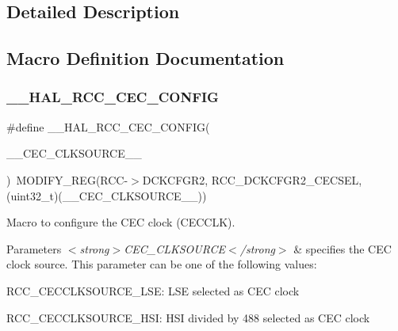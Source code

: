 \subsection{Detailed Description}


\subsection{Macro Definition Documentation}
\mbox{\label{group___r_c_c_ex___exported___macros_ga9e0aa37c13e7e0751abf5c271ff0affb}} 
\subsubsection{\texorpdfstring{\_\_HAL\_RCC\_CEC\_CONFIG}{\_\_HAL\_RCC\_CEC\_CONFIG}}
{\footnotesize\ttfamily \#define \+\_\+\+\_\+\+H\+A\+L\+\_\+\+R\+C\+C\+\_\+\+C\+E\+C\+\_\+\+C\+O\+N\+F\+IG(\begin{DoxyParamCaption}\item[{}]{\+\_\+\+\_\+\+C\+E\+C\+\_\+\+C\+L\+K\+S\+O\+U\+R\+C\+E\+\_\+\+\_\+ }\end{DoxyParamCaption})~M\+O\+D\+I\+F\+Y\+\_\+\+R\+EG(R\+CC-\/$>$D\+C\+K\+C\+F\+G\+R2, R\+C\+C\+\_\+\+D\+C\+K\+C\+F\+G\+R2\+\_\+\+C\+E\+C\+S\+EL, (uint32\+\_\+t)(\+\_\+\+\_\+\+C\+E\+C\+\_\+\+C\+L\+K\+S\+O\+U\+R\+C\+E\+\_\+\+\_\+))}



Macro to configure the C\+EC clock (C\+E\+C\+C\+LK). 


\begin{DoxyParams}{Parameters}
{\em $<$strong$>$\+C\+E\+C\+\_\+\+C\+L\+K\+S\+O\+U\+R\+C\+E$<$/strong$>$} & specifies the C\+EC clock source. This parameter can be one of the following values\+: \begin{DoxyItemize}
\item R\+C\+C\+\_\+\+C\+E\+C\+C\+L\+K\+S\+O\+U\+R\+C\+E\+\_\+\+L\+SE\+: L\+SE selected as C\+EC clock \item R\+C\+C\+\_\+\+C\+E\+C\+C\+L\+K\+S\+O\+U\+R\+C\+E\+\_\+\+H\+SI\+: H\+SI divided by 488 selected as C\+EC clock \end{DoxyItemize}
\\
\hline
\end{DoxyParams}
\mbox{\label{group___r_c_c_ex___exported___macros_ga24e95e53683115f1e978ad1bff021a77}} 
